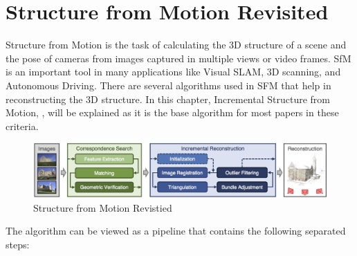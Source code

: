 \documentclass[11pt]{article}
\begin{document}
    \section{Structure from Motion Revisited}
    Structure from Motion is the task of calculating the 3D structure of a scene and the pose of cameras from
    images captured in multiple views or video frames. SfM is an important tool in many applications like
    Visual SLAM, 3D scanning, and Autonomous Driving. There are several algorithms used in SFM that help
    in reconstructing the 3D structure. In this chapter, Incremental Structure from Motion, \cite{7780814}, will be explained
    as it is the base algorithm for most papers in these criteria.

    \begin{figure}
    \centering
    \includegraphics[width=\textwidth,height=\textheight,keepaspectratio]{images/sfm.png}
    \caption{Structure from Motion Revistied}
    \end{figure}

    The algorithm can be viewed as a pipeline that contains the following separated steps:
\end{document}
